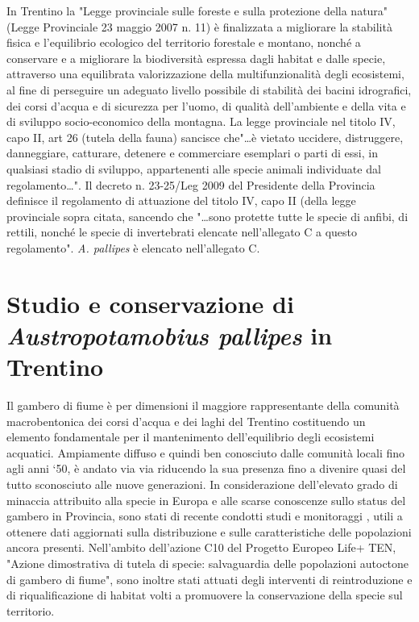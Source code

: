 \documentclass[11pt,a4paper,italian,twoside,openany]{memoir}
\newcommand\BackgroundPicTwo{
  \put(0,0){
    \parbox[b][\paperheight]{\paperwidth}{%
      \vfill
      \centering
      \texttt{[image: 2.pdf]}
      \vfill
    }
  }
}
\newcommand\DeactivateBG{\backgroundsetup{contents={}}}
\begin{document}
In Trentino la "Legge provinciale sulle foreste e sulla protezione della natura" (Legge Provinciale 23 maggio 2007 n. 11) è finalizzata a migliorare la stabilità fisica e l'equilibrio ecologico del territorio forestale e montano, nonché a conservare e a migliorare la biodiversità espressa dagli habitat e dalle specie, attraverso una equilibrata valorizzazione della multifunzionalità degli ecosistemi, al fine di perseguire un adeguato livello possibile di stabilità dei bacini idrografici, dei corsi d'acqua e di sicurezza per l'uomo, di qualità dell'ambiente e della vita e di sviluppo socio-economico della montagna. La legge provinciale nel titolo IV, capo II, art 26 (tutela della fauna) sancisce che"\dots  è vietato uccidere, distruggere, danneggiare, catturare, detenere e commerciare esemplari o parti di essi, in qualsiasi stadio di sviluppo, appartenenti alle specie animali individuate dal regolamento\dots". Il decreto n. 23-25/Leg 2009 del Presidente della Provincia definisce il regolamento di attuazione del titolo IV, capo II (della legge provinciale sopra citata, sancendo che "\dots sono protette tutte le specie di anfibi, di rettili, nonché le specie di invertebrati elencate nell'allegato C a questo regolamento". \emph{A. pallipes} è elencato nell'allegato C.

\chapter{Studio e conservazione di \emph{Austropotamobius pallipes} in Trentino}
\DeactivateBG
\AddToShipoutPicture*{\BackgroundPicTwo}

Il gambero di fiume è per dimensioni il maggiore rappresentante della comunità macrobentonica dei corsi d'acqua e dei laghi del Trentino costituendo un elemento fondamentale per il mantenimento dell'equilibrio degli ecosistemi acquatici. Ampiamente diffuso e quindi ben conosciuto dalle comunità locali fino agli anni ‘50, è andato via via riducendo la sua presenza fino a divenire quasi del tutto sconosciuto alle nuove generazioni. In considerazione dell'elevato grado di minaccia attribuito alla specie in Europa e alle scarse conoscenze sullo status del gambero in Provincia, sono stati di recente condotti studi e monitoraggi \cite{Ciutti 2013} \cite{Endrizzi 2013}, utili a ottenere dati aggiornati sulla distribuzione e sulle caratteristiche delle popolazioni ancora presenti. Nell'ambito dell'azione C10 del Progetto Europeo Life+ TEN, "Azione dimostrativa di tutela di specie: salvaguardia delle popolazioni autoctone di gambero di fiume", sono inoltre stati attuati degli interventi di reintroduzione e di riqualificazione di habitat volti a promuovere la conservazione della specie sul territorio.
\end{document}

